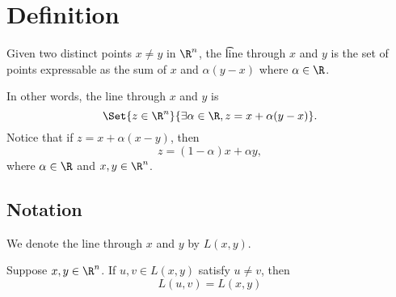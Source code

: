 
\section*{Definition}

Given two distinct points $x \neq y$ in $\R ^n$, the \t{line} through $x$ and $y$ is the set of points expressable as the sum of $x$ and $\alpha (y-x)$ where $\alpha  \in \R $.

In other words, the line through $x$ and $y$ is
\[
\Set{z \in \R ^n}{\exists  \alpha  \in \R , z = x + \alpha (y - x)}.
\]
Notice that if $z = x + \alpha (x-y)$, then
\[
z = (1 - \alpha )x + \alpha y,
\]
where $\alpha  \in \R $ and $x, y \in \R ^n$.

\subsection*{Notation}

We denote the line through $x$ and $y$ by $L(x,y)$.

\begin{proposition}
Suppose $x, y \in \R ^n$.
If $u, v \in L(x, y)$ satisfy $u\neq v$, then
\[
L(u, v) = L(x, y)
\]
\end{proposition}

\blankpage